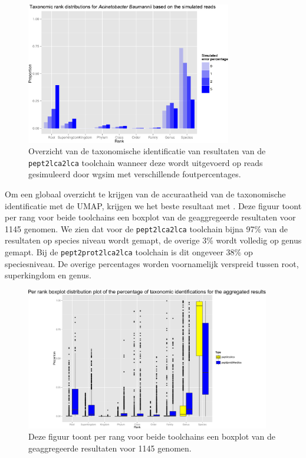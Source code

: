 \begin{figure}
	\centering \includegraphics[width=0.8\textwidth]{includes/errors.pdf}
	\caption{Overzicht van de taxonomische identificatie van resultaten van de
	\texttt{pept2lca2lca} toolchain wanneer deze wordt uitgevoerd op reads
	gesimuleerd door wgsim met verschillende foutpercentages.} 
	\label{fig:errors}
\end{figure}

Om een globaal overzicht te krijgen van de accuraatheid van de taxonomische
identificatie met de UMAP, krijgen we het beste resultaat met
. Deze figuur toont per rang voor beide toolchains een boxplot
van de geaggregeerde resultaten voor 1145 genomen. We zien dat voor de
\texttt{pept2lca2lca} toolchain bijna 97\% van de resultaten op species niveau
wordt gemapt, de overige 3\% wordt volledig op genus gemapt. Bij de
\texttt{pept2prot2lca2lca} toolchain is dit ongeveer 38\% op speciesniveau. De
overige percentages worden voornamelijk verspreid tussen root, superkingdom en
genus.

\begin{figure}
	\centering \includegraphics[width=0.95\textwidth]{includes/boxplot.pdf}
	\caption{Deze figuur toont per rang voor beide toolchains een boxplot van de
	geaggregeerde resultaten voor 1145 genomen. } \label{fig:boxplot}
\end{figure}

